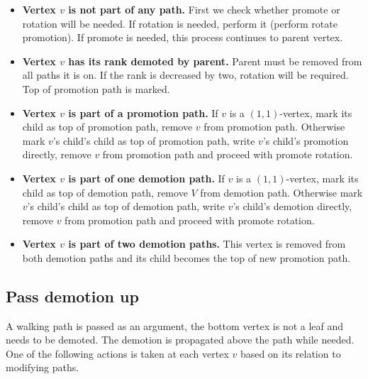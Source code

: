 \begin{itemize}

\item {\bfseries Vertex $v$ is not part of any path.} First we check whether promote or rotation will be needed. If rotation is needed, perform it (perform rotate promotion). If promote is needed, this process continues to parent vertex.

\item {\bfseries Vertex $v$ has its rank demoted by parent.} Parent must be removed from all paths it is on. If the rank is decreased by two, rotation will be required. Top of promotion path is marked.

\item {\bfseries Vertex $v$ is part of a promotion path.} If $v$ is a $(1,1)$-vertex, mark its child as top of promotion path, remove $v$ from promotion path. Otherwise mark $v$'s child's child as top of promotion path, write $v$'s child's promotion directly, remove $v$ from promotion path and proceed with promote rotation. 

\item {\bfseries Vertex $v$ is part of one demotion path.} If $v$ is a $(1,1)$-vertex, mark its child as top of demotion path, remove $V$ from demotion path. Otherwise mark $v$'s child's child as top of demotion path, write $v$'s child's demotion directly, remove $v$ from promotion path and proceed with promote rotation.

\item {\bfseries Vertex $v$ is part of two demotion paths.} This vertex is removed from both demotion paths and its child becomes the top of new promotion path.

\end{itemize}

\subsection{Pass demotion up}

A walking path is passed as an argument, the bottom vertex is not a leaf and needs to be demoted. The demotion is propagated above the path while needed. One of the following actions is taken at each vertex $v$ based on its relation to modifying paths.

